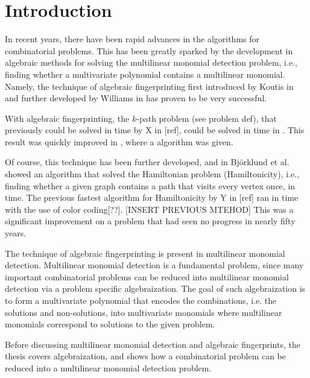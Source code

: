 
\section{Introduction}

In recent years, there have been rapid advances in the algorithms for combinatorial problems. 
This has been greatly sparked by the development in algebraic methods for solving the 
multilinear monomial detection problem, i.e., finding whether a multivariate polynomial contains a multilinear monomial. 
Namely, the technique of algebraic fingerprinting 
first introduced by Koutis in \cite{10.1007/978-3-540-70575-8_47} and further developed by Williams in \cite{WILLIAMS2009315} has proven 
to be very successful.\nl

With algebraic fingerprinting, the $k$-path problem (see problem def), 
that previously could be solved in  time by X in [ref], 
could be solved in  time in \cite{10.1007/978-3-540-70575-8_47}. 
This result was quickly improved in \cite{WILLIAMS2009315}, where a  algorithm was given.\nl

Of course, this technique has been further developed, and in \cite{doi:10.1137/110839229} Björklund et al. showed an algorithm 
that solved the Hamiltonian problem (Hamiltonicity), i.e., finding whether a given graph contains a path that visits 
every vertex once, in  time. The previous fastest algorithm for Hamiltonicity by Y 
in [ref] ran in  time with the use of color coding[??]. [INSERT PREVIOUS MTEHOD] 
This was a significant improvement on a problem that had seen no progress in nearly fifty years.\nl

The technique of algebraic fingerprinting is present in multilinear monomial detection. Multilinear monomial detection 
is a fundamental problem, since many important combinatorial problems can be reduced into multilinear monomial detection 
via a problem specific algebraization. The goal of such algebraization is to form a multivariate polynomial 
that encodes the combinations, i.e. the solutions and non-solutions, into multivariate monomials where 
multilinear monomials correspond to solutions to the given problem.\nl

Before discussing multilinear monomial detection and algebraic fingerprints, the thesis covers algebraization, and 
shows how a combinatorial problem can be reduced into a multilinear monomial detection problem. 


